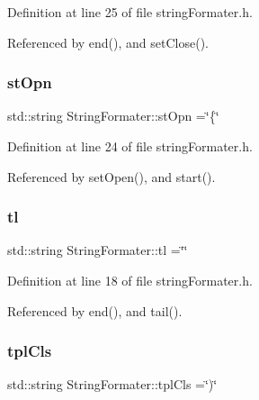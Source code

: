 Definition at line 25 of file string\+Formater.\+h.



Referenced by end(), and set\+Close().

\mbox{\label{classStringFormater_a379be3eaf83aed31e04273af58ac9c06}} 
\subsubsection{\texorpdfstring{st\+Opn}{stOpn}}
{\footnotesize\ttfamily std\+::string String\+Formater\+::st\+Opn =\char`\"{}\{\char`\"{}\hspace{0.3cm}{\ttfamily [private]}}



Definition at line 24 of file string\+Formater.\+h.



Referenced by set\+Open(), and start().

\mbox{\label{classStringFormater_a8f78ca87611e1e1e35534100c4aeaccd}} 
\subsubsection{\texorpdfstring{tl}{tl}}
{\footnotesize\ttfamily std\+::string String\+Formater\+::tl =\char`\"{}\char`\"{}\hspace{0.3cm}{\ttfamily [private]}}



Definition at line 18 of file string\+Formater.\+h.



Referenced by end(), and tail().

\mbox{\label{classStringFormater_a334df00dacdd2898052b9b4e70b06e3b}} 
\subsubsection{\texorpdfstring{tpl\+Cls}{tplCls}}
{\footnotesize\ttfamily std\+::string String\+Formater\+::tpl\+Cls =\char`\"{})\char`\"{}\hspace{0.3cm}{\ttfamily [private]}}



